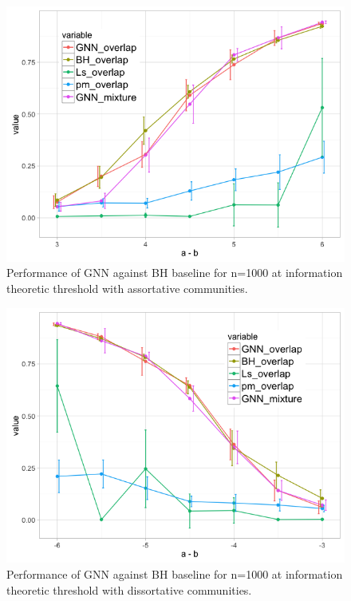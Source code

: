 \begin{figure}[H]
\begin{center}
  \includegraphics[scale=0.55]{Assortative.png}
  \caption{Performance of GNN against BH baseline for n=1000 at information theoretic threshold with assortative communities.}
  \label{fig:ass}
\end{center}
\end{figure}

\begin{figure}[H]
\begin{center}
  \includegraphics[scale=0.55]{dissortative.png}
  \caption{Performance of GNN against BH baseline for n=1000 at information theoretic threshold with dissortative communities.}
  \label{fig:diss}
\end{center}
\end{figure}

